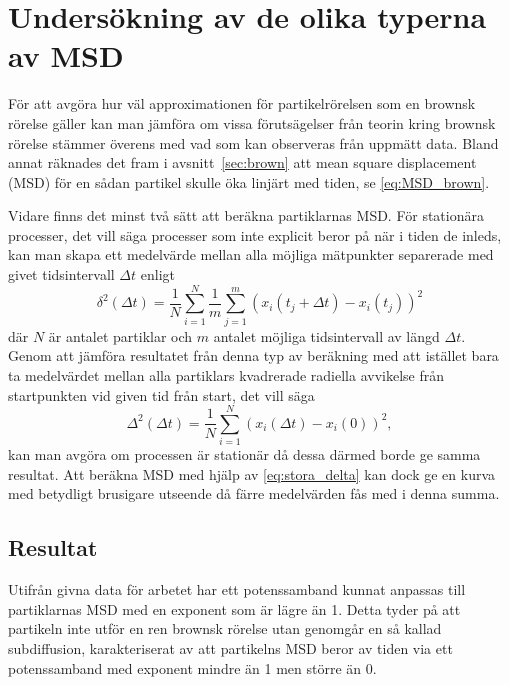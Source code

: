 \section{Undersökning av de olika typerna av MSD}

För att avgöra hur väl approximationen för partikelrörelsen som en brownsk rörelse gäller kan man jämföra om vissa förutsägelser från teorin kring brownsk rörelse stämmer överens med vad som kan observeras från uppmätt data. Bland annat räknades det fram i avsnitt~\ref{sec:brown} att mean square displacement (MSD) för en sådan partikel skulle öka linjärt med tiden, se \eqref{eq:MSD_brown}.

Vidare finns det minst två sätt att beräkna partiklarnas MSD. För stationära processer, det vill säga processer som inte explicit beror på när i tiden de inleds, kan man skapa ett medelvärde mellan alla möjliga mätpunkter separerade med givet tidsintervall $\Delta{t}$ enligt
\begin{equation} \label{eq:lilla_delta}
    \delta^2(\Delta t)= \frac{1}{N}\sum^N_{i=1}\frac{1}{m}\sum^m_{j=1}(x_i(t_j+\Delta t)-x_i(t_j))^2
\end{equation} 
där $N$ är antalet partiklar och $m$ antalet möjliga tidsintervall av längd $\Delta t$.
Genom att jämföra resultatet från denna typ av beräkning med att istället bara ta medelvärdet mellan alla partiklars kvadrerade radiella avvikelse från startpunkten vid given tid från start, det vill säga
\begin{equation} \label{eq:stora_delta}%
    \Delta^2(\Delta t)= \frac{1}{N}\sum^N_{i=1}(x_i(\Delta t)-x_i(0))^2,
\end{equation} 
kan man avgöra om processen är stationär då dessa därmed borde ge samma resultat. Att beräkna MSD med hjälp av \eqref{eq:stora_delta} kan dock ge en kurva med betydligt brusigare utseende då färre medelvärden fås med i denna summa. 

\subsection{Resultat}
Utifrån givna data för arbetet har ett potenssamband kunnat anpassas till partiklarnas MSD med en exponent som är lägre än 1. Detta tyder på att partikeln inte utför en ren brownsk rörelse utan genomgår en så kallad subdiffusion, karakteriserat av att partikelns MSD beror av tiden via ett potenssamband med exponent mindre än 1 men större än 0.

